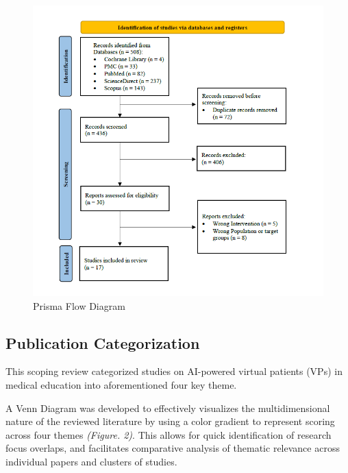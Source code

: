 \begin{figure}[ht]
    \centering
    \includegraphics[width=0.95\linewidth]{figures/Prisma_flow_smartdoc_v1.png}
    \caption{Prisma Flow Diagram}
    \label{fig:1}
\end{figure}

\subsection{Publication Categorization}

This scoping review categorized studies on AI-powered virtual patients (VPs) in medical education into aforementioned four key theme.

A Venn Diagram was developed to effectively visualizes the multidimensional nature of the reviewed literature by using a color gradient to represent scoring across four themes \textit{(Figure. 2)}. This allows for quick identification of research focus overlaps, and facilitates comparative analysis of thematic relevance across individual papers and clusters of studies.

